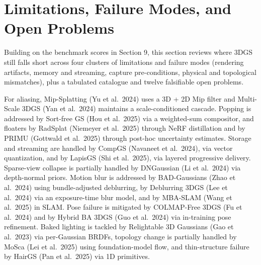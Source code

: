 \documentclass{article}
\begin{document}
\section{Limitations, Failure Modes, and Open Problems}\label{limitations-failure-modes-and-open-problems}

Building on the benchmark scores in Section 9, this section reviews where 3DGS still falls short across four clusters of limitations and failure modes (rendering artifacts, memory and streaming, capture pre-conditions, physical and topological mismatches), plus a tabulated catalogue and twelve falsifiable open problems.

For aliasing, Mip-Splatting (Yu et al.~2024) uses a 3D + 2D Mip filter and Multi-Scale 3DGS (Yan et al.~2024) maintains a scale-conditioned cascade. Popping is addressed by Sort-free GS (Hou et al.~2025) via a weighted-sum compositor, and floaters by RadSplat (Niemeyer et al.~2025) through NeRF distillation and by PRIMU (Gottwald et al.~2025) through post-hoc uncertainty estimates. Storage and streaming are handled by CompGS (Navaneet et al.~2024), via vector quantization, and by LapisGS (Shi et al.~2025), via layered progressive delivery. Sparse-view collapse is partially handled by DNGaussian (Li et al.~2024) via depth-normal priors. Motion blur is addressed by BAD-Gaussians (Zhao et al.~2024) using bundle-adjusted deblurring, by Deblurring 3DGS (Lee et al.~2024) via an exposure-time blur model, and by MBA-SLAM (Wang et al.~2025) in SLAM. Pose failure is mitigated by COLMAP-Free 3DGS (Fu et al.~2024) and by Hybrid BA 3DGS (Guo et al.~2024) via in-training pose refinement. Baked lighting is tackled by Relightable 3D Gaussians (Gao et al.~2023) via per-Gaussian BRDFs, topology change is partially handled by MoSca (Lei et al.~2025) using foundation-model flow, and thin-structure failure by HairGS (Pan et al.~2025) via 1D primitives.
\end{document}
